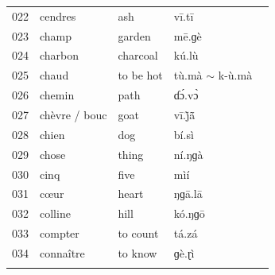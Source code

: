 \documentclass[output=paper,colorlinks,citecolor=brown
]{langscibook}
\begin{document}
\begin{paperappendix}
\begin{table}
\begin{tabular}{lllll}
022	& cendres & ash & vī.tī & \\
023	& champ & garden & mē.ɡè & \\
024	& charbon & charcoal & kú.lù & \\
025	& chaud	& to be hot & tù.mà \(\sim \) k-ù.mà & \\
026	& chemin & path & ɗɔ́.vɔ̀ & \\
027	& chèvre / bouc & goat & vī.j̃ã̄ & \\
028	& chien & dog & bí.sì & \\
029	& chose & thing & ní.ŋɡà & \\
030	& cinq & five & mìí & \\
031	& cœur & heart & ŋɡā.lā & \\
032	& colline & hill & kó.ŋɡō & \\
033	& compter & to count & tá.zá & \\
034	& connaître & to know & ɡè.ɽì & \\
  \lspbottomrule
 \end{tabular}
\end{table}


\end{paperappendix}
\end{document}
